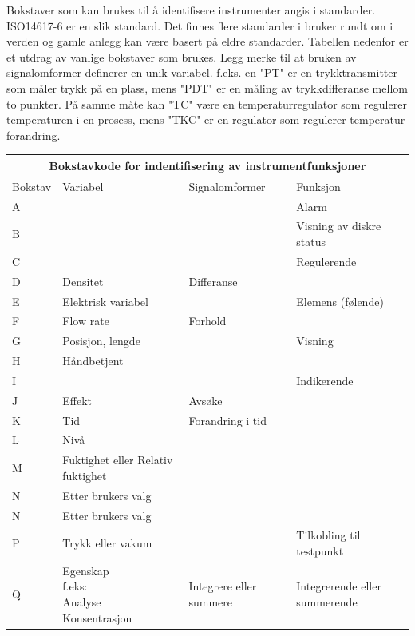 \filbreak

Bokstaver som kan brukes til å identifisere instrumenter angis i standarder. ISO14617-6 er en slik standard. Det finnes flere standarder i bruker rundt om i verden og gamle anlegg kan være basert på eldre standarder. Tabellen nedenfor er et utdrag av vanlige bokstaver som brukes. Legg merke til at bruken av signalomformer definerer en unik variabel. f.eks. en "PT" er en trykktransmitter som måler trykk på en plass, mens "PDT" er en måling av trykkdifferanse mellom to punkter. På samme måte kan "TC" være en temperaturregulator som regulerer temperaturen i en prosess, mens "TKC" er en regulator som regulerer temperatur forandring. 

\begin{center}
\begin{tabular}{ | m{1.5cm} | m{4.5cm}| m{4.5cm} | m{4.5cm} |} 
\hline
\multicolumn{4}{|c|}{Bokstavkode for indentifisering av instrumentfunksjoner} \\
\hline
	Bokstav & Variabel& Signalomformer & Funksjon \\ 
\hline
	A&&&Alarm\\
\hline
	B&&&Visning av diskre status\\
\hline
	C&&&Regulerende\\
\hline
	D&Densitet&Differanse&\\
\hline
	E&Elektrisk variabel&&Elemens (følende)\\
\hline
	F&Flow rate&Forhold&\\
\hline
	G&Posisjon, lengde&&Visning\\
\hline
	H&Håndbetjent&&\\
	\hline
	I&&&Indikerende\\
	\hline
	J&Effekt&Avsøke&\\
	\hline
	K&Tid&Forandring i tid&\\
	\hline
	L&Nivå&&\\
	\hline
	M&Fuktighet eller Relativ fuktighet&&\\
	\hline
	N&Etter brukers valg&&\\
	\hline
	N&Etter brukers valg&&\\
	\hline
	P&Trykk eller vakum&&Tilkobling til testpunkt\\
	\hline
	Q&\makecell{Egenskap\\f.eks:\\*Analyse\\*Konsentrasjon}&Integrere eller summere&Integrerende eller summerende\\

\end{tabular}
\end{center}
